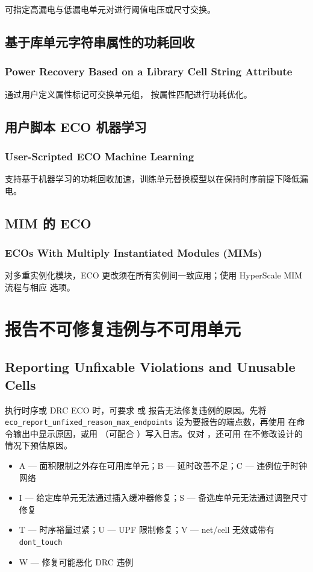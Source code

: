 可指定高漏电与低漏电单元对进行阈值电压或尺寸交换。

\subsection{基于库单元字符串属性的功耗回收}
\subsubsection*{Power Recovery Based on a Library Cell String Attribute}

通过用户定义属性标记可交换单元组， 按属性匹配进行功耗优化。

\subsection{用户脚本 ECO 机器学习}
\subsubsection*{User-Scripted ECO Machine Learning}

支持基于机器学习的功耗回收加速，训练单元替换模型以在保持时序前提下降低漏电。

\subsection{MIM 的 ECO}
\subsubsection*{ECOs With Multiply Instantiated Modules (MIMs)}

对多重实例化模块，ECO 更改须在所有实例间一致应用；使用 HyperScale MIM 流程与相应  选项。

\section{报告不可修复违例与不可用单元}
\subsection*{Reporting Unfixable Violations and Unusable Cells}

执行时序或 DRC ECO 时，可要求  或  报告无法修复违例的原因。先将 \texttt{eco\_report\_unfixed\_reason\_max\_endpoints} 设为要报告的端点数，再使用  在命令输出中显示原因，或用 （可配合 ）写入日志。仅对 ，还可用  在不修改设计的情况下预估原因。
\begin{itemize}
  \item A — 面积限制之外存在可用库单元；B — 延时改善不足；C — 违例位于时钟网络
  \item I — 给定库单元无法通过插入缓冲器修复；S — 备选库单元无法通过调整尺寸修复
  \item T — 时序裕量过紧；U — UPF 限制修复；V — net/cell 无效或带有 \texttt{dont\_touch}
  \item W — 修复可能恶化 DRC 违例
\end{itemize}

